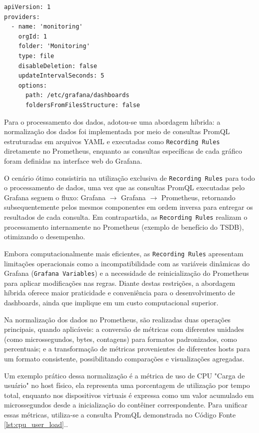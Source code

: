 {\begin{lstlisting}[caption={Arquivo dashboards.yml}, label={lst:dashboards-yml}]
apiVersion: 1
providers:
  - name: 'monitoring'
    orgId: 1
    folder: 'Monitoring'
    type: file
    disableDeletion: false
    updateIntervalSeconds: 5
    options:
      path: /etc/grafana/dashboards
      foldersFromFilesStructure: false
\end{lstlisting}

Para o processamento dos dados, adotou-se uma abordagem híbrida: a normalização dos dados foi implementada por meio de consultas PromQL estruturadas em arquivos YAML e executadas como \verb|Recording Rules| diretamente no Prometheus, enquanto as consultas específicas de cada gráfico foram definidas na interface web do Grafana.

O cenário ótimo consistiria na utilização exclusiva de \texttt{Recording Rules} para todo o processamento de dados, uma vez que as consultas PromQL executadas pelo Grafana seguem o fluxo: Grafana  $\rightarrow$ Grafana  $\rightarrow$ Prometheus, retornando subsequentemente pelos mesmos componentes em ordem inversa para entregar os resultados de cada consulta. Em contrapartida, as \verb|Recording Rules| realizam o processamento internamente no Prometheus (exemplo de benefício do TSDB), otimizando o desempenho.

Embora computacionalmente mais eficientes, as \texttt{Recording Rules} apresentam limitações operacionais como a incompatibilidade com as variáveis dinâmicas do Grafana (\verb|Grafana Variables|) e a necessidade de reinicialização do Prometheus para aplicar modificações nas regras. Diante destas restrições, a abordagem híbrida oferece maior praticidade e conveniência para o desenvolvimento de dashboards, ainda que implique em um custo computacional superior.

Na normalização dos dados no Prometheus, são realizadas duas operações principais, quando aplicáveis: a conversão de métricas com diferentes unidades (como microssegundos, bytes, contagens) para formatos padronizados, como percentuais; e a transformação de métricas provenientes de diferentes hosts para um formato consistente, possibilitando comparações e visualizações agregadas.

Um exemplo prático dessa normalização é a métrica de uso de CPU "Carga de usuário" no host físico, ela representa uma porcentagem de utilização por tempo total, enquanto nos dispositivos virtuais é expressa como um valor acumulado em microssegundos desde a inicialização do contêiner correspondente. Para unificar essas métricas, utiliza-se a consulta PromQL demonstrada no Código Fonte \ref{lst:cpu_user_load}..

}
